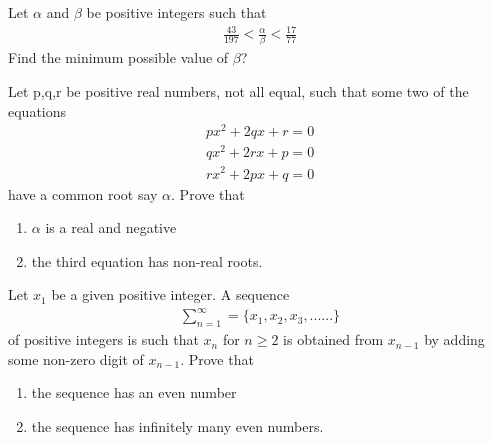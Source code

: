 \item Let $\alpha$ and $\beta$ be positive integers such that
\begin{align*}
\frac{43}{197} < \frac{\alpha}{\beta} < \frac{17}{77}
\end{align*}
Find the minimum possible value of $\beta$?

\item Let p,q,r be positive real numbers, not all equal, such that some two of the equations 
\begin{align}
px^{2} + 2qx + r = 0 
\end{align}
\begin{align} 
qx^{2} + 2rx + p = 0 
\end{align}  
\begin{align} 
rx^{2} + 2px + q = 0 
\end{align} 
have a common root say $\alpha$. Prove that 
\begin{enumerate}
\item $\alpha$ is a real and negative
\item the third equation has non-real roots.
\end{enumerate}

\item Let $x_1$ be a given positive integer. A sequence 
\begin{align*}
\sum_{n=1}^{\infty} = \{x_1, x_2, x_3,......\}
\end{align*}
of positive integers is such that $x_n$ for $n \geq 2$ is obtained from $x_{n-1}$ by adding some non-zero digit of $x_{n-1}$. Prove that
\begin{enumerate}
\item the sequence has an even number
\item the sequence has infinitely many even numbers.
\end{enumerate}


















